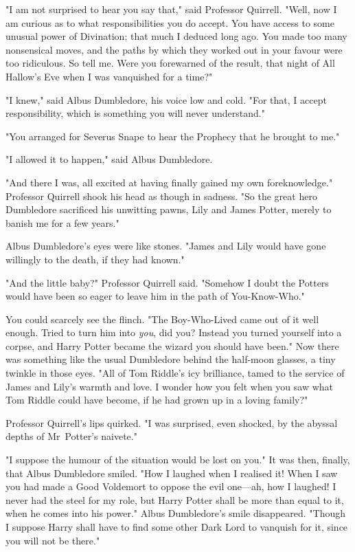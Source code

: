 "I am not surprised to hear you say that," said Professor Quirrell. "Well, now
I am curious as to what responsibilities you do accept. You have access to some
unusual power of Divination; that much I deduced long ago. You made too many
nonsensical moves, and the paths by which they worked out in your favour were
too ridiculous. So tell me. Were you forewarned of the result, that night of
All Hallow's Eve when I was vanquished for a time?"

"I knew," said Albus Dumbledore, his voice low and cold. "For that, I accept
responsibility, which is something you will never understand."

"You arranged for Severus Snape to hear the Prophecy that he brought to me."

"I allowed it to happen," said Albus Dumbledore.

"And there I was, all excited at having finally gained my own foreknowledge."
Professor Quirrell shook his head as though in sadness. "So the great hero
Dumbledore sacrificed his unwitting pawns, Lily and James Potter, merely to
banish me for a few years."

Albus Dumbledore's eyes were like stones. "James and Lily would have gone
willingly to the death, if they had known."

"And the little baby?" Professor Quirrell said. "Somehow I doubt the Potters
would have been so eager to leave him in the path of You-Know-Who."

You could scarcely see the flinch. "The Boy-Who-Lived came out of it well
enough. Tried to turn him into \emph{you}, did you? Instead you turned yourself
into a corpse, and Harry Potter became the wizard you should have been." Now
there was something like the usual Dumbledore behind the half-moon glasses, a
tiny twinkle in those eyes. "All of Tom Riddle's icy brilliance, tamed to the
service of James and Lily's warmth and love. I wonder how you felt when you saw
what Tom Riddle could have become, if he had grown up in a loving family?"

Professor Quirrell's lips quirked. "I was surprised, even shocked, by the
abyssal depths of Mr~Potter's naivete."

"I suppose the humour of the situation would be lost on you." It was then,
finally, that Albus Dumbledore smiled. "How I laughed when I realised it! When
I saw you had made a Good Voldemort to oppose the evil one---ah, how I laughed!
I never had the steel for my role, but Harry Potter shall be more than equal to
it, when he comes into his power." Albus Dumbledore's smile disappeared.
"Though I suppose Harry shall have to find some other Dark Lord to vanquish for
it, since you will not be there."


